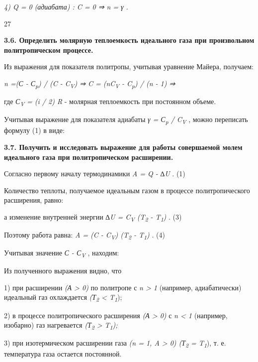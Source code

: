 \emph{4) Q = 0 (адиабата) : C = 0 ⇒ n = γ .}

27

\textbf{3.6. Определить молярную теплоемкость идеального газа при
произвольном политропическом процессе.}

\solving{}

Из выражения для показателя политропы, учитывая уравнение Майера,
получаем:

\emph{n =(С - С\textsubscript{p}) / (C - C\textsubscript{V}) ⇒ C =
(nC\textsubscript{V} - C\textsubscript{p}) / (n - 1) ⇒}

где \emph{С\textsubscript{V} = (i / 2) R} - молярная теплоемкость при
постоянном объеме.

Учитывая выражение для показателя адиабаты \emph{γ = С\textsubscript{p}
/ C\textsubscript{V}} , можно переписать формулу (1) в виде:

\textbf{3.7. Получить и исследовать выражение для работы совершаемой
молем идеального газа при политропическом расширении.}

\solving{}

Согласно первому началу термодинамики \emph{A = Q - ∆U} . (1)

Количество теплоты, получаемое идеальным газом в процессе
политропического расширения, равно:


а изменение внутренней энергии \emph{∆U = C\textsubscript{V}
(T\textsubscript{2} - T\textsubscript{1})} . (3)

Поэтому работа равна: \emph{A = (C - C\textsubscript{V})
(T\textsubscript{2} - T\textsubscript{1})} . (4)

Учитывая значение \emph{С - С\textsubscript{V}} , находим:


Из полученного выражения видно, что

1) при расширении \emph{(А \textgreater{} 0)} по политропе с \emph{n
\textgreater{} 1} (например, адиабатически) идеальный газ охлаждается
\emph{(Т\textsubscript{2} \textless{} T\textsubscript{1}});

2) в процессе политропического расширения \emph{(А \textgreater{} 0)} с
\emph{n \textless{} 1} (например, изобарно) газ нагревается
\emph{(Т\textsubscript{2} \textgreater{} T\textsubscript{1});}

3) при изотермическом расширении газа \emph{(n = 1, A \textgreater{} 0)
(Т\textsubscript{2} = T\textsubscript{1}}), т. е. температура газа
остается постоянной.

